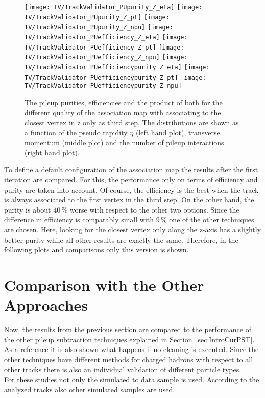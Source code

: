 \begin{figure}[h!t]
  \centering
  \texttt{[image: TV/TrackValidator\_PUpurity\_Z\_eta]}
  \texttt{[image: TV/TrackValidator\_PUpurity\_Z\_pt]}
  \texttt{[image: TV/TrackValidator\_PUpurity\_Z\_npu]}
  \newline
  \texttt{[image: TV/TrackValidator\_PUefficiency\_Z\_eta]}
  \texttt{[image: TV/TrackValidator\_PUefficiency\_Z\_pt]}
  \texttt{[image: TV/TrackValidator\_PUefficiency\_Z\_npu]}
  \newline
  \texttt{[image: TV/TrackValidator\_PUefficiencypurity\_Z\_eta]}
  \texttt{[image: TV/TrackValidator\_PUefficiencypurity\_Z\_pt]}
  \texttt{[image: TV/TrackValidator\_PUefficiencypurity\_Z\_npu]}
  \caption[Pileup purities, efficiencies and their product for the different quality of the association map with associating to the closest vertex in z only as third step]{The pileup purities, efficiencies and the product of both for the different quality of the association map with associating to the closest vertex in z only as third step. The distributions are shown as a function of the pseudo rapidity $\eta$ (left hand plot), transverse momentum (middle plot) and the number of pileup interactions (right hand plot). \label{plot:TASEFRDQZPileup}}
\end{figure}

To define a default configuration of the association map the results after the first iteration are compared. For this, the performance only on terms of efficiency and purity are taken into account. Of course, the efficiency is the best when the track is always associated to the first vertex in the third step. On the other hand, the purity is about $40\,\%$ worse with respect to the other two options. Since the difference in efficiency is comparably small with $9\,\%$ one of the other techniques are chosen. Here, looking for the closest vertex only along the z-axis has a slightly better purity while all other results are exactly the same. Therefore, in the following plots and comparisons only this version is shown.

\section{Comparison with the Other Approaches \label{sec:TASEFRDA}}

Now, the results from the previous section are compared to the performance of the other pileup subtraction techniques explained in Section~\ref{sec:IntroCurPST}. As a reference it is also shown what happens if no cleaning is executed. Since the other techniques have different methods for charged hadrons with respect to all other tracks there is also an individual validation of different particle types. \\
For these studies not only the simulated \Zz to \MM data sample is used. According to the analyzed tracks also other simulated samples are used.

